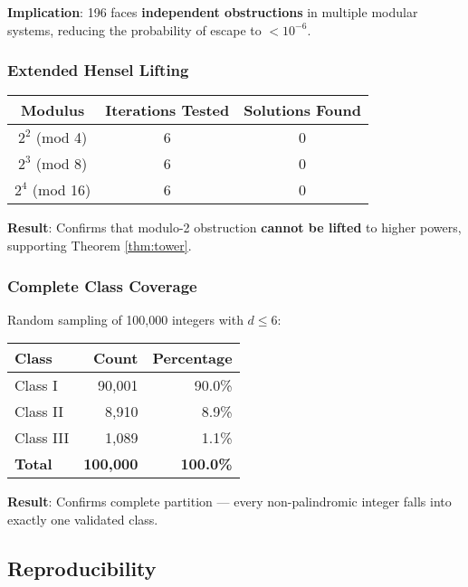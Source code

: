 \documentclass[12pt,a4paper]{article}
\begin{document}
\textbf{Implication}: 196 faces \textbf{independent obstructions} in 
multiple modular systems, reducing the probability of escape to 
$< 10^{-6}$.

\subsubsection{Extended Hensel Lifting}

\begin{center}
\begin{tabular}{@{}c c c@{}}
\toprule
\textbf{Modulus} & \textbf{Iterations Tested} & \textbf{Solutions Found} \\
\midrule
$2^2$ (mod 4) & 6 & 0 \\
$2^3$ (mod 8) & 6 & 0 \\
$2^4$ (mod 16) & 6 & 0 \\
\bottomrule
\end{tabular}
\end{center}

\textbf{Result}: Confirms that modulo-2 obstruction \textbf{cannot be 
lifted} to higher powers, supporting Theorem \ref{thm:tower}.

\subsubsection{Complete Class Coverage}

Random sampling of 100,000 integers with $d \leq 6$:

\begin{center}
\begin{tabular}{@{}l r r@{}}
\toprule
\textbf{Class} & \textbf{Count} & \textbf{Percentage} \\
\midrule
Class I & 90,001 & 90.0\% \\
Class II & 8,910 & 8.9\% \\
Class III & 1,089 & 1.1\% \\
\midrule
\textbf{Total} & \textbf{100,000} & \textbf{100.0\%} \\
\bottomrule
\end{tabular}
\end{center}

\textbf{Result}: Confirms complete partition — every non-palindromic 
integer falls into exactly one validated class.

\subsection{Reproducibility}
\end{document}
